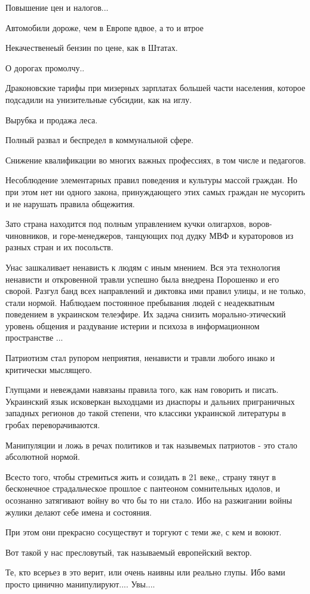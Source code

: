 Повышение цен и налогов...

Автомобили дороже, чем в Европе вдвое, а то и втрое

Некачественеый бензин по цене, как в Штатах.

О дорогах промолчу..

Драконовские тарифы при мизерных зарплатах большей части населения, которое
подсадили на унизительные субсидии, как на иглу.

Вырубка и продажа леса.

Полный развал и беспредел в коммунальной сфере.

Снижение квалификации во многих важных профессиях, в том числе и педагогов.

Несоблюдение элементарных правил поведения и культуры массой граждан. Но при
этом нет ни одного закона, принуждающего этих самых граждан не мусорить и не
нарушать правила общежития.

Зато страна  находится под полным управлением кучки олигархов,
воров-чиновников,  и горе-менеджеров, танцующих под дудку МВФ и кураторовов из
разных стран и их посольств.

Унас зашкаливает ненависть к людям с иным мнением. Вся эта технология ненависти
и откровенной травли успешно была внедрена Порошенко и его сворой. Разгул банд
всех направлений и диктовка ими правил улицы, и  не только, стали нормой.
Наблюдаем постоянное пребывания людей с неадекватным поведением в украинском
телеэфире. Их задача снизить морально-этический уровень общения и раздувание
истерии и психоза в информационном пространстве ...

Патриотизм стал рупором неприятия,  ненависти и травли любого инако и
критически мыслящего.

Глупцами и невеждами навязаны правила того, как нам говорить и писать.
Украинский язык исковеркан выходцами из диаспоры и  дальних приграничных
западных регионов до такой степени, что классики украинской литературы в
гробах переворачиваются.

Манипуляции и ложь в речах политиков и так назывемых патриотов - это стало
абсолютной нормой.

Всесто того, чтобы стремиться жить и созидать  в 21 веке,, страну тянут в
бесконечное страдальческое прошлое с пантеоном сомнительных идолов, и осознанно
затягивают войну во что бы то ни стало. Ибо на разжигании войны жулики делают
себе имена и состояния.

При этом они прекрасно сосуществут и торгуют с теми же, с кем и воюют.

Вот такой у нас пресловутый, так называемый европейский вектор.

Те, кто всерьез в это верит, или очень наивны или реально глупы. Ибо вами
просто цинично манипулируют.... Увы....
